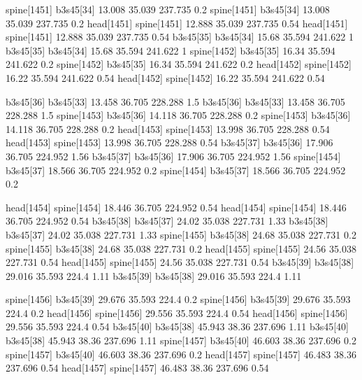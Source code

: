 spine[1451]    b3s45[34]    13.008    35.039    237.735    0.2
spine[1451]    b3s45[34]    13.008    35.039    237.735    0.2
head[1451]    spine[1451]    12.888    35.039    237.735    0.54
head[1451]    spine[1451]    12.888    35.039    237.735    0.54
b3s45[35]    b3s45[34]    15.68    35.594    241.622    1
b3s45[35]    b3s45[34]    15.68    35.594    241.622    1
spine[1452]    b3s45[35]    16.34    35.594    241.622    0.2
spine[1452]    b3s45[35]    16.34    35.594    241.622    0.2
head[1452]    spine[1452]    16.22    35.594    241.622    0.54
head[1452]    spine[1452]    16.22    35.594    241.622    0.54


b3s45[36]    b3s45[33]    13.458    36.705    228.288    1.5
b3s45[36]    b3s45[33]    13.458    36.705    228.288    1.5
spine[1453]    b3s45[36]    14.118    36.705    228.288    0.2
spine[1453]    b3s45[36]    14.118    36.705    228.288    0.2
head[1453]    spine[1453]    13.998    36.705    228.288    0.54
head[1453]    spine[1453]    13.998    36.705    228.288    0.54
b3s45[37]    b3s45[36]    17.906    36.705    224.952    1.56
b3s45[37]    b3s45[36]    17.906    36.705    224.952    1.56
spine[1454]    b3s45[37]    18.566    36.705    224.952    0.2
spine[1454]    b3s45[37]    18.566    36.705    224.952    0.2


head[1454]    spine[1454]    18.446    36.705    224.952    0.54
head[1454]    spine[1454]    18.446    36.705    224.952    0.54
b3s45[38]    b3s45[37]    24.02    35.038    227.731    1.33
b3s45[38]    b3s45[37]    24.02    35.038    227.731    1.33
spine[1455]    b3s45[38]    24.68    35.038    227.731    0.2
spine[1455]    b3s45[38]    24.68    35.038    227.731    0.2
head[1455]    spine[1455]    24.56    35.038    227.731    0.54
head[1455]    spine[1455]    24.56    35.038    227.731    0.54
b3s45[39]    b3s45[38]    29.016    35.593    224.4    1.11
b3s45[39]    b3s45[38]    29.016    35.593    224.4    1.11


spine[1456]    b3s45[39]    29.676    35.593    224.4    0.2
spine[1456]    b3s45[39]    29.676    35.593    224.4    0.2
head[1456]    spine[1456]    29.556    35.593    224.4    0.54
head[1456]    spine[1456]    29.556    35.593    224.4    0.54
b3s45[40]    b3s45[38]    45.943    38.36    237.696    1.11
b3s45[40]    b3s45[38]    45.943    38.36    237.696    1.11
spine[1457]    b3s45[40]    46.603    38.36    237.696    0.2
spine[1457]    b3s45[40]    46.603    38.36    237.696    0.2
head[1457]    spine[1457]    46.483    38.36    237.696    0.54
head[1457]    spine[1457]    46.483    38.36    237.696    0.54


